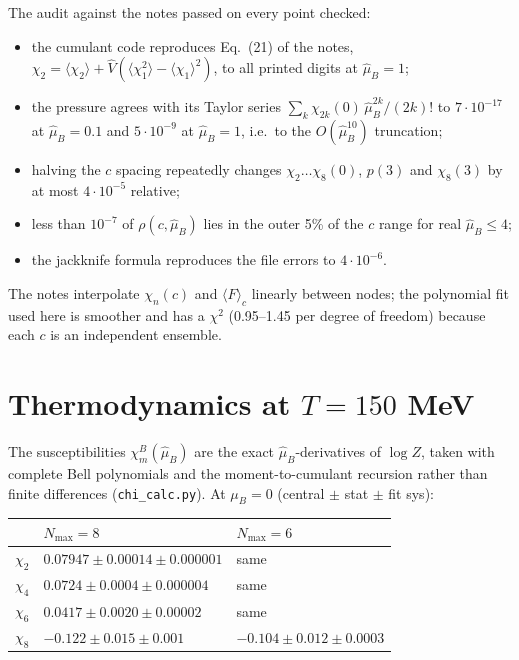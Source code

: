 \documentclass[11pt,a4paper]{article}
\newcommand{\muB}{\mu_B}
\newcommand{\hmu}{\hat{\mu}_B}
\newcommand{\hV}{\hat{V}}
\newcommand{\Nmax}{N_{\max}}
\newcommand{\code}[1]{\texttt{#1}}
\begin{document}
The audit against the notes passed on every point checked:
\begin{itemize}[nosep]
\item the cumulant code reproduces Eq.~(21) of the notes, $\chi_2=\langle\chi_2\rangle+\hV(\langle\chi_1^2\rangle-\langle\chi_1\rangle^2)$, to all printed digits at $\hmu=1$;
\item the pressure agrees with its Taylor series $\sum_k\chi_{2k}(0)\,\hmu^{2k}/(2k)!$ to $7\cdot10^{-17}$ at $\hmu=0.1$ and $5\cdot10^{-9}$ at $\hmu=1$, i.e.\ to the $O(\hmu^{10})$ truncation;
\item halving the $c$ spacing repeatedly changes $\chi_2\ldots\chi_8(0)$, $p(3)$ and $\chi_8(3)$ by at most $4\cdot10^{-5}$ relative;
\item less than $10^{-7}$ of $\rho(c,\hmu)$ lies in the outer 5\% of the $c$ range for real $\hmu\le4$;
\item the jackknife formula reproduces the file errors to $4\cdot10^{-6}$.
\end{itemize}
The notes interpolate $\chi_n(c)$ and $\langle F\rangle_c$ linearly between nodes; the polynomial fit used here is smoother and has a $\chi^2$ (0.95--1.45 per degree of freedom) because each $c$ is an independent ensemble.

\section{Thermodynamics at \texorpdfstring{$T=150$}{T = 150} MeV}

The susceptibilities $\chi^B_m(\hmu)$ are the exact $\hmu$-derivatives of $\log Z$, taken with complete Bell polynomials and the moment-to-cumulant recursion rather than finite differences (\code{chi\_calc.py}). At $\muB=0$ (central $\pm$ stat $\pm$ fit sys):

\begin{center}\small
\begin{tabular}{lll}
\toprule
 & $\Nmax=8$ & $\Nmax=6$ \\
\midrule
$\chi_2$ & $0.07947\pm0.00014\pm0.000001$ & same \\
$\chi_4$ & $0.0724\pm0.0004\pm0.000004$ & same \\
$\chi_6$ & $0.0417\pm0.0020\pm0.00002$ & same \\
$\chi_8$ & $-0.122\pm0.015\pm0.001$ & $-0.104\pm0.012\pm0.0003$ \\
\bottomrule
\end{tabular}
\end{center}
\end{document}
